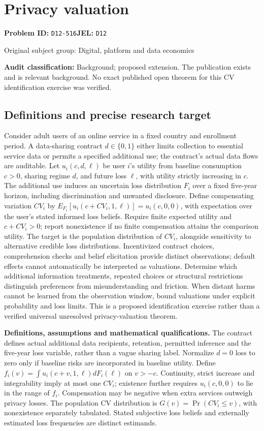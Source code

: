 \documentclass[11pt,a4paper]{article}
\begin{document}
\section*{Privacy valuation}
\textbf{Problem ID:} \texttt{D12-516}\quad \textbf{JEL:} \texttt{D12}\par
\label{problem:OP-0406}
{\sffamily\small\color{muted}Original subject group: Digital, platform and data economics\par}
\label{definitions:problem:30007688}
\textbf{Audit classification:} Background; proposed extension. The publication exists and is relevant background. No exact published open theorem for this CV identification exercise was verified.
\subsection*{Definitions and precise research target}
Consider adult users of an online service in a fixed country and enrollment period. A data-sharing contract \(d\in\{0,1\}\) either limits collection to essential service data or permits a specified additional use; the contract's actual data flows are auditable. Let \(u_i(c,d,\ell)\) be user \(i\)'s utility from baseline consumption \(c>0\), sharing regime \(d\), and future loss \(\ell\), with utility strictly increasing in \(c\). The additional use induces an uncertain loss distribution \(F_i\) over a fixed five-year horizon, including discrimination and unwanted disclosure. Define compensating variation \(CV_i\) by \(E_{F_i}[u_i(c+CV_i,1,\ell)]=u_i(c,0,0)\), with expectation over the user's stated informed loss beliefs. Require finite expected utility and \(c+CV_i>0\); report nonexistence if no finite compensation attains the comparison utility. The target is the population distribution of \(CV_i\), alongside sensitivity to alternative credible loss distributions. Incentivized contract choices, comprehension checks and belief elicitation provide distinct observations; default effects cannot automatically be interpreted as valuations. Determine which additional information treatments, repeated choices or structural restrictions distinguish preferences from misunderstanding and friction. When distant harms cannot be learned from the observation window, bound valuations under explicit probability and loss limits. This is a proposed identification exercise rather than a verified universal unresolved privacy-valuation theorem.

\textbf{Definitions, assumptions and mathematical qualifications.} The contract defines actual additional data recipients, retention, permitted inference and the five-year loss variable, rather than a vague sharing label. Normalize \(d=0\) loss to zero only if baseline risks are incorporated in baseline utility. Define \(f_i(v)=\int u_i(c+v,1,\ell)dF_i(\ell)\) on \(v>-c\). Continuity, strict increase and integrability imply at most one \(CV_i\); existence further requires \(u_i(c,0,0)\) to lie in the range of \(f_i\). Compensation may be negative when extra services outweigh privacy losses. The population CV distribution is \(G(v)=\Pr(CV_i\leq v)\), with nonexistence separately tabulated. Stated subjective loss beliefs and externally estimated loss frequencies are distinct estimands.
\end{document}
